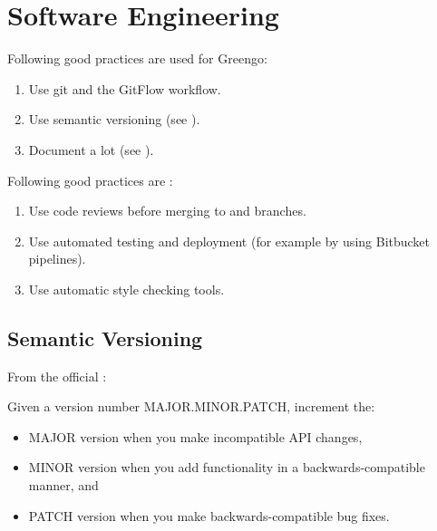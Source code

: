 \documentclass[letterpaper,10pt,english]{sphinxmanual}
\begin{document}
\chapter{Software Engineering}
\label{\detokenize{software_engineering:software-engineering}}\label{\detokenize{software_engineering::doc}}
Following good practices are used for Greengo:
\begin{enumerate}
\def\theenumi{\arabic{enumi}}
\def\labelenumi{\theenumi .}
\makeatletter\def\p@enumii{\p@enumi \theenumi .}\makeatother
\item {} 
Use git and the GitFlow workflow.

\item {} 
Use semantic versioning (see {\hyperref[\detokenize{software_engineering:semantic-versioning}]{}}).

\item {} 
Document a lot (see {\hyperref[\detokenize{building_a_microservice:service-documentation}]{}}).

\end{enumerate}

Following good practices are :
\begin{enumerate}
\def\theenumi{\arabic{enumi}}
\def\labelenumi{\theenumi .}
\makeatletter\def\p@enumii{\p@enumi \theenumi .}\makeatother
\item {} 
Use code reviews before merging to  and  branches.

\item {} 
Use automated testing and deployment (for example by using Bitbucket pipelines).

\item {} 
Use automatic style checking tools.

\end{enumerate}


\section{Semantic Versioning}
\label{\detokenize{software_engineering:semantic-versioning}}\label{\detokenize{software_engineering:id1}}
From the official :

Given a version number MAJOR.MINOR.PATCH, increment the:
\begin{itemize}
\item {} 
MAJOR version when you make incompatible API changes,

\item {} 
MINOR version when you add functionality in a backwards-compatible manner, and

\item {} 
PATCH version when you make backwards-compatible bug fixes.

\end{itemize}
\end{document}
